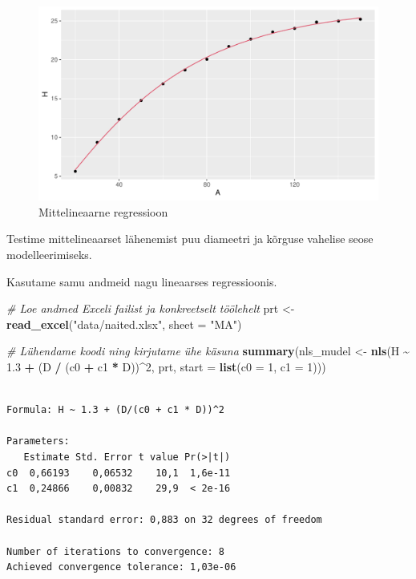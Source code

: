 \documentclass[
]{book}
\newenvironment{Shaded}{\begin{snugshade}}{\end{snugshade}}
\newcommand{\AttributeTok}[1]{\textcolor[rgb]{0.13,0.29,0.53}{#1}}
\newcommand{\CommentTok}[1]{\textcolor[rgb]{0.56,0.35,0.01}{\textit{#1}}}
\newcommand{\DecValTok}[1]{\textcolor[rgb]{0.00,0.00,0.81}{#1}}
\newcommand{\FloatTok}[1]{\textcolor[rgb]{0.00,0.00,0.81}{#1}}
\newcommand{\FunctionTok}[1]{\textcolor[rgb]{0.13,0.29,0.53}{\textbf{#1}}}
\newcommand{\NormalTok}[1]{#1}
\newcommand{\OtherTok}[1]{\textcolor[rgb]{0.56,0.35,0.01}{#1}}
\newcommand{\SpecialCharTok}[1]{\textcolor[rgb]{0.81,0.36,0.00}{\textbf{#1}}}
\newcommand{\StringTok}[1]{\textcolor[rgb]{0.31,0.60,0.02}{#1}}
\renewenvironment{Shaded} {\begin{snugshade}\footnotesize} {\end{snugshade}}
\begin{document}
\begin{figure}[H]
\includegraphics[width=0.8\linewidth]{_main_files/figure-latex/unnamed-chunk-65-1} \caption{Mittelineaarne regressioon}\label{fig:unnamed-chunk-65}
\end{figure}

Testime mittelineaarset lähenemist puu diameetri ja kõrguse vahelise seose modelleerimiseks.

Kasutame samu andmeid nagu lineaarses regressioonis.

\begin{Shaded}
\begin{Highlighting}[]
\CommentTok{\# Loe andmed Exceli failist ja konkreetselt töölehelt}
\NormalTok{prt }\OtherTok{\textless{}{-}} \FunctionTok{read\_excel}\NormalTok{(}\StringTok{"data/naited.xlsx"}\NormalTok{, }\AttributeTok{sheet =} \StringTok{"MA"}\NormalTok{)}
\end{Highlighting}
\end{Shaded}

\begin{Shaded}
\begin{Highlighting}[]
\CommentTok{\# Lühendame koodi ning kirjutame ühe käsuna}
\FunctionTok{summary}\NormalTok{(nls\_mudel }\OtherTok{\textless{}{-}} \FunctionTok{nls}\NormalTok{(H }\SpecialCharTok{\textasciitilde{}} \FloatTok{1.3} \SpecialCharTok{+}\NormalTok{ (D }\SpecialCharTok{/}\NormalTok{ (c0 }\SpecialCharTok{+}\NormalTok{ c1 }\SpecialCharTok{*}\NormalTok{ D))}\SpecialCharTok{\^{}}\DecValTok{2}\NormalTok{, prt, }\AttributeTok{start =} \FunctionTok{list}\NormalTok{(}\AttributeTok{c0 =} \DecValTok{1}\NormalTok{, }\AttributeTok{c1 =} \DecValTok{1}\NormalTok{)))}
\end{Highlighting}
\end{Shaded}

\begin{verbatim}

Formula: H ~ 1.3 + (D/(c0 + c1 * D))^2

Parameters:
   Estimate Std. Error t value Pr(>|t|)
c0  0,66193    0,06532    10,1  1,6e-11
c1  0,24866    0,00832    29,9  < 2e-16

Residual standard error: 0,883 on 32 degrees of freedom

Number of iterations to convergence: 8 
Achieved convergence tolerance: 1,03e-06
\end{verbatim}
\end{document}
